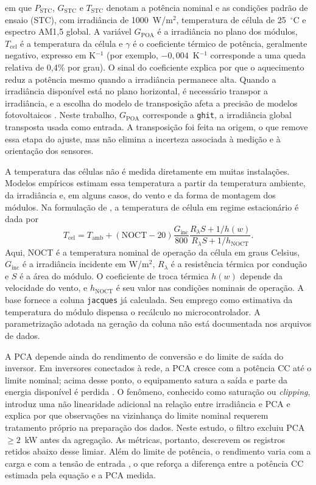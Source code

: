 \noindent em que $P_{\mathrm{STC}}$, $G_{\mathrm{STC}}$ e $T_{\mathrm{STC}}$
denotam a potência nominal e as condições padrão de ensaio (STC), com
irradiância de 1000~W/m$^2$, temperatura de célula de 25~$^\circ$C e
espectro AM1,5 global. A variável $G_{\mathrm{POA}}$ é a irradiância no
plano dos módulos, $T_{\mathrm{cel}}$ é a temperatura da célula e $\gamma$ é
o coeficiente térmico de potência, geralmente negativo, expresso em K$^{-1}$
(por exemplo, $-0{,}004$~K$^{-1}$ corresponde a uma queda relativa de 0,4\%
por grau). O sinal do coeficiente explica por que o aquecimento reduz a
potência mesmo quando a irradiância permanece alta. Quando a irradiância
disponível está no plano horizontal, é necessário transpor a irradiância, e
a escolha do modelo de transposição afeta a precisão de modelos
fotovoltaicos \cite{dolara2015modelos,mayer2020modelos}. Neste trabalho,
$G_{\mathrm{POA}}$ corresponde a \texttt{ghit}, a irradiância global
transposta usada como entrada. A transposição foi feita na origem, o que
remove essa etapa do ajuste, mas não elimina a incerteza associada à medição
e à orientação dos sensores.

A temperatura das células não é medida diretamente em muitas
instalações. Modelos empíricos estimam essa temperatura a partir da
temperatura ambiente, da irradiância e, em alguns casos, do vento e da
forma de montagem dos módulos. Na formulação de , a
temperatura de célula em regime estacionário é dada por
\begin{equation}
\label{eq:jacques}
T_{\mathrm{cel}}=T_{\mathrm{amb}}+
(\mathrm{NOCT}-20)\frac{G_{\mathrm{inc}}}{800}
\frac{R_\lambda S+1/h(w)}{R_\lambda S+1/h_{\mathrm{NOCT}}}.
\end{equation}
Aqui, NOCT é a temperatura nominal de operação da célula em graus Celsius,
$G_{\mathrm{inc}}$ é a irradiância incidente em W/m$^2$, $R_\lambda$ é a
resistência térmica por condução e $S$ é a área do módulo. O coeficiente de
troca térmica $h(w)$ depende da velocidade do vento, e $h_{\mathrm{NOCT}}$ é
seu valor nas condições nominais de operação. A base fornece a coluna
\texttt{jacques} já calculada. Seu emprego como estimativa da temperatura do
módulo dispensa o recálculo no microcontrolador. A parametrização adotada na
geração da coluna não está documentada nos arquivos de dados.

A PCA depende ainda do rendimento de conversão e do limite de saída do
inversor. Em inversores conectados à rede, a PCA cresce com a potência CC
até o limite nominal; acima desse ponto, o equipamento satura a saída e
parte da energia disponível é perdida \cite{good2016}. O fenômeno, conhecido
como saturação ou \textit{clipping}, introduz uma não linearidade adicional
na relação entre irradiância e PCA e explica por que observações na
vizinhança do limite nominal requerem tratamento próprio na preparação dos
dados. Neste estudo, o filtro excluiu PCA $\geq 2$~kW antes da agregação. As
métricas, portanto, descrevem os registros retidos abaixo desse limiar. Além
do limite de potência, o rendimento varia com a carga e com a tensão de
entrada \cite{chmielowiec2022}, o que reforça a diferença entre a potência
CC estimada pela equação e a PCA medida.

